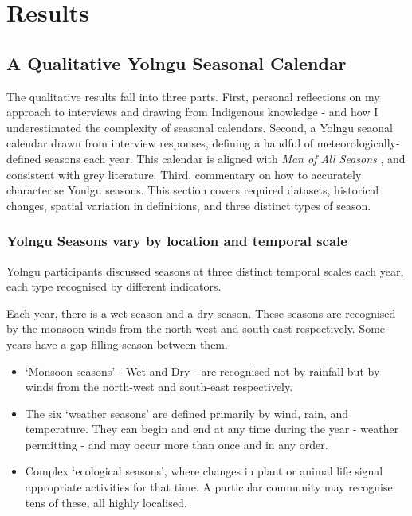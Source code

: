 \chapter{Results}
\label{ch:results}




\section{A Qualitative Yolngu Seasonal Calendar}

The qualitative results fall into three parts.
%
First, personal reflections on my approach to interviews and drawing
from Indigenous knowledge - and how I underestimated the complexity
of seasonal calendars.
%
Second, a Yolngu seaonal calendar drawn from interview responses,
defining a handful of meteorologically-defined seasons each year.
This calendar is aligned with \textit{Man of All Seasons} \citep{davis1989},
and consistent with grey literature.
%
Third, commentary on how to accurately characterise Yonlgu seasons.
This section covers required datasets, historical changes, spatial
variation in definitions, and three distinct types of season.





\subsection{Yolngu Seasons vary by location and temporal scale}
\label{subsec:three-seasons-scales}

Yolngu participants discussed seasons at three distinct temporal scales
each year, each type recognised by different indicators.

Each year, there is a wet season and a dry season.  These seasons are
recognised by the monsoon winds from the north-west and south-east
respectively.  Some years have a gap-filling season between them.

\begin{itemize}
\item `Monsoon seasons' - Wet and Dry - are recognised not by rainfall but
        by winds from the north-west and south-east respectively.
\item The six `weather seasons' are defined primarily by wind, rain, and temperature.
        They can begin and end at any time during the year - weather permitting -
        and may occur more than once and in any order.
\item Complex `ecological seasons', where changes in plant or animal life
        signal appropriate activities for that time.  A particular community
        may recognise tens of these, all highly localised.
\end{itemize}

